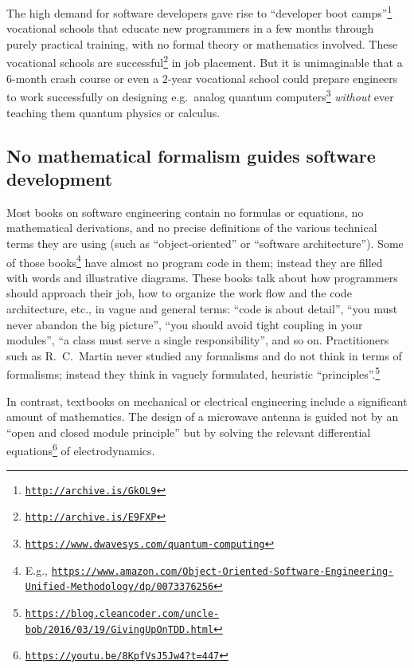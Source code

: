The high demand for software developers gave rise to \textsf{``}developer
boot camps\textsf{''}\footnote{\texttt{\href{http://archive.is/GkOL9}{http://archive.is/GkOL9}}}
\textemdash{} vocational schools that educate new programmers in a
few months through purely practical training, with no formal theory
or mathematics involved. These vocational schools are successful\footnote{\texttt{\href{http://archive.is/E9FXP}{http://archive.is/E9FXP}}}
in job placement. But it is unimaginable that a $6$-month crash course
or even a $2$-year vocational school could prepare engineers to work
successfully on designing e.g.~analog quantum computers\footnote{\texttt{\href{https://www.dwavesys.com/quantum-computing}{https://www.dwavesys.com/quantum-computing}}}
\emph{without} ever teaching them quantum physics or calculus.

\subsection{No mathematical formalism guides software development}

Most books on software engineering contain no formulas or equations,
no mathematical derivations, and no precise definitions of the various
technical terms they are using (such as \textsf{``}object-oriented\textsf{''} or \textsf{``}software
architecture\textsf{''}). Some of those books\footnote{E.g., \texttt{\href{https://www.amazon.com/Object-Oriented-Software-Engineering-Unified-Methodology/dp/0073376256}{https://www.amazon.com/Object-Oriented-Software-Engineering-Unified-Methodology/dp/0073376256}}}
have almost no program code in them; instead they are filled with
words and illustrative diagrams. These books talk about how programmers
should approach their job, how to organize the work flow and the code
architecture, etc., in vague and general terms: \textsf{``}code is about detail\textsf{''},
\textsf{``}you must never abandon the big picture\textsf{''}, \textsf{``}you should avoid
tight coupling in your modules\textsf{''}, \textsf{``}a class must serve a single
responsibility\textsf{''}, and so on. Practitioners such as R.\ C.\ Martin
never studied any formalisms and do not think in terms of formalisms;
instead they think in vaguely formulated, heuristic \textquotedblleft principles\textquotedblright .\footnote{\texttt{\href{https://blog.cleancoder.com/uncle-bob/2016/03/19/GivingUpOnTDD.html}{https://blog.cleancoder.com/uncle-bob/2016/03/19/GivingUpOnTDD.html}}}

In contrast, textbooks on mechanical or electrical engineering include
a significant amount of mathematics. The design of a microwave antenna
is guided not by an \textsf{``}open and closed module principle\textsf{''} but by
solving the relevant differential equations\footnote{\texttt{\href{https://youtu.be/8KpfVsJ5Jw4?t=447}{https://youtu.be/8KpfVsJ5Jw4?t=447}}}
of electrodynamics.

